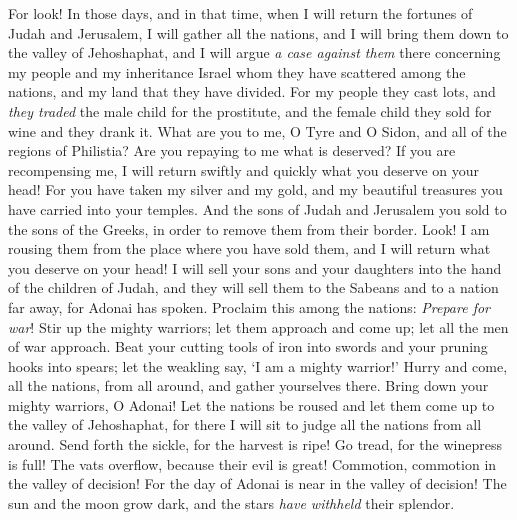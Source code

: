 \begin{biblechapter} %
  For look! In those days, and in that time, when I will return the fortunes of Judah and Jerusalem,
\verse I will gather all the nations, and I will bring them down to the valley of Jehoshaphat, and I will argue \textit{a case against them} there concerning my people and my inheritance Israel whom they have scattered among the nations, and my land that they have divided.
\verse For my people they cast lots, and \textit{they traded} the male child for the prostitute, and the female child they sold for wine and they drank it.
\verse What are you to me, O Tyre and O Sidon, and all of the regions of Philistia? Are you repaying to me what is deserved? If you are recompensing me, I will return swiftly and quickly what you deserve on your head!
\verse For you have taken my silver and my gold, and my beautiful treasures you have carried into your temples.
\verse And the sons of Judah and Jerusalem you sold to the sons of the Greeks, in order to remove them from their border.
\verse Look! I am rousing them from the place where you have sold them, and I will return what you deserve on your head!
\verse I will sell your sons and your daughters into the hand of the children of Judah, and they will sell them to the Sabeans and to a nation far away, for Adonai has spoken.
 Proclaim this among the nations: 
\textit{Prepare for war}! 
Stir up the mighty warriors; 
let them approach and come up; 
let all the men of war approach.
\verse Beat your cutting tools of iron into swords 
and your pruning hooks into spears; 
let the weakling say, ‘I am a mighty warrior!’
\verse Hurry and come, 
all the nations, from all around, 
and gather yourselves there. 
Bring down your mighty warriors, O Adonai!
\verse Let the nations be roused and let them come up 
to the valley of Jehoshaphat, 
for there I will sit to judge 
all the nations from all around.
\verse Send forth the sickle, 
for the harvest is ripe! 
Go tread, 
for the winepress is full! 
The vats overflow, 
because their evil is great!
\verse Commotion, commotion 
in the valley of decision! 
For the day of Adonai is near 
in the valley of decision!
\verse The sun and the moon grow dark, 
and the stars \textit{have withheld} their splendor.

\end{biblechapter}
